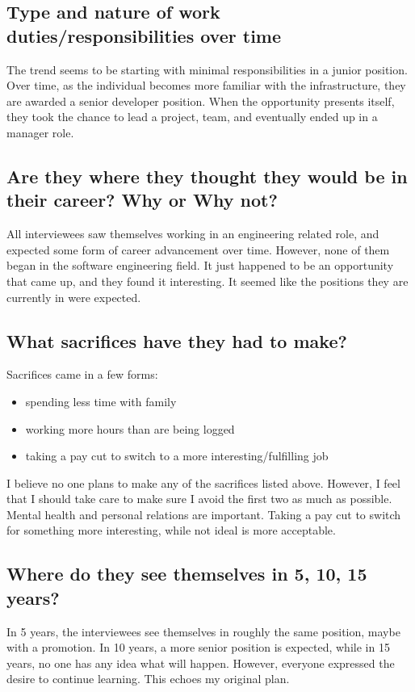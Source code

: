 \subsection{Type and nature of work duties/responsibilities over time}
The trend seems to be starting with minimal responsibilities in a junior
position. Over time, as the individual becomes more familiar with the
infrastructure, they are awarded a senior developer position. When the
opportunity presents itself, they took the chance to lead a project, team, and
eventually ended up in a manager role. 

\subsection{Are they where they thought they would be in their career? Why or Why not?}
All interviewees saw themselves working in an engineering related role, and
expected some form of career advancement over time. However, none of them began
in the software engineering field. It just happened to be an opportunity that
came up, and they found it interesting. It seemed like the positions they
are currently in were expected. 

\subsection{What sacrifices have they had to make?}
Sacrifices came in a few forms:
\begin{singlespace}
  \begin{itemize}
    \item spending less time with family
    \item working more hours than are being logged
    \item taking a pay cut to switch to a more interesting/fulfilling job
  \end{itemize}
\end{singlespace}
I believe no one plans to make any of the sacrifices listed above. 
However, I feel that I should take care to make sure I avoid the first two 
as much as possible. Mental health and personal relations are important. 
Taking a pay cut to switch for something more interesting, while not ideal
is more acceptable. 

\subsection{Where do they see themselves in 5, 10, 15 years?}
In 5 years, the interviewees see themselves in roughly the same position, maybe
with a promotion. In 10 years, a more senior position is expected, while in 15
years, no one has any idea what will happen.  However, everyone expressed the
desire to continue learning.  This echoes my original plan.

